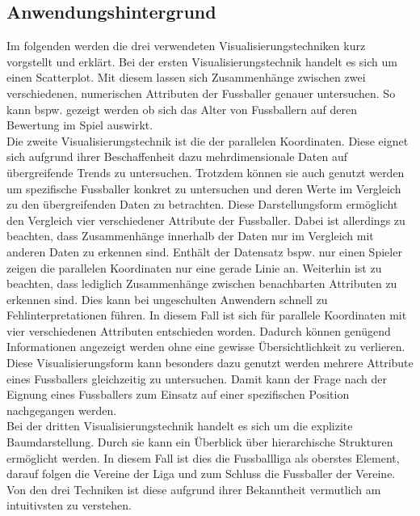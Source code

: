 \documentclass[usegeometry=true]{scrartcl}
\begin{document}
\newpage


\subsection{Anwendungshintergrund}

Im folgenden werden die drei verwendeten Visualisierungstechniken kurz vorgstellt und erklärt.
Bei der ersten Visualisierungstechnik handelt es sich um einen Scatterplot.\cite{noauthor_complete_nodate} Mit diesem lassen sich Zusammenhänge zwischen zwei verschiedenen, numerischen Attributen der Fussballer genauer untersuchen. So kann bspw. gezeigt werden ob sich das Alter von Fussballern auf deren Bewertung im Spiel auswirkt.\\
Die zweite Visualisierungstechnik ist die der parallelen Koordinaten.\cite{few_multivariate_nodate} Diese eignet sich aufgrund ihrer Beschaffenheit dazu mehrdimensionale Daten auf übergreifende Trends zu untersuchen. Trotzdem können sie auch genutzt werden um spezifische Fussballer konkret zu untersuchen und deren Werte im Vergleich zu den übergreifenden Daten zu betrachten. 
Diese Darstellungsform ermöglicht den Vergleich vier verschiedener Attribute der Fussballer. Dabei ist allerdings zu beachten, dass Zusammenhänge innerhalb der Daten nur im Vergleich mit anderen Daten zu erkennen sind. Enthält der Datensatz bspw. nur einen Spieler zeigen die parallelen Koordinaten nur eine gerade Linie an. Weiterhin ist zu beachten, dass lediglich Zusammenhänge zwischen benachbarten Attributen zu erkennen sind. Dies kann bei ungeschulten Anwendern schnell zu Fehlinterpretationen führen.
In diesem Fall ist sich für parallele Koordinaten mit vier verschiedenen Attributen entschieden worden. Dadurch können genügend Informationen angezeigt werden ohne eine gewisse Übersichtlichkeit zu verlieren. Diese Visualisierungsform kann besonders dazu genutzt werden mehrere Attribute eines Fussballers gleichzeitig zu untersuchen. Damit kann der Frage nach der Eignung eines Fussballers zum Einsatz auf einer spezifischen Position nachgegangen werden.\\
Bei der dritten Visualisierungstechnik handelt es sich um die explizite Baumdarstellung. Durch sie kann ein Überblick über hierarchische Strukturen ermöglicht werden. In diesem Fall ist dies die Fussballliga als oberstes Element, darauf folgen die Vereine der Liga und zum Schluss die Fussballer der Vereine. Von den drei Techniken ist diese aufgrund ihrer Bekanntheit vermutlich am intuitivsten zu verstehen.
\end{document}
